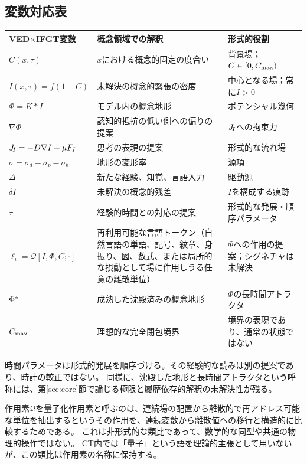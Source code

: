 \subsection{変数対応表}
\begin{center}
\renewcommand{\arraystretch}{1.5}
\begin{tabular}{p{}p{}p{}}
\toprule
\textbf{VED$\times$IFGT変数} &
\textbf{概念領域での解釈} &
\textbf{形式的役割} \\
\midrule
$C(x,\tau)$ & $x$における概念的固定の度合い & 背景場；$C \in [0,C_{\max})$ \\
$I(x,\tau) = f(1-C)$ & 未解決の概念的緊張の密度 & 中心となる場；常に$I > 0$ \\
$\Phi = K*I$ & モデル内の概念地形 & ポテンシャル幾何 \\
$\nabla\Phi$ & 認知的抵抗の低い側への偏りの提案 & $J_{\!I}$への拘束力 \\
$J_{\!I} = -D\nabla I + \mu F_I$ & 思考の表現の提案 & 形式的な流れ場 \\
$\sigma = \sigma_d - \sigma_p - \sigma_b$ & 地形の変形率 & 源項 \\
$\Delta$ & 新たな経験、知覚、言語入力 & 駆動源 \\
$\delta I$ & 未解決の概念的残差 & $I$を構成する痕跡 \\
$\tau$ & 経験的時間との対応の提案 & 形式的な発展・順序パラメータ \\
$\ell_i = \mathcal{Q}[I,\Phi,C;\cdot]$ & 再利用可能な言語トークン（自然言語の単語、記号、紋章、身振り、図、数式、または局所的な摂動として場に作用しうる任意の離散単位） & $\Phi$への作用の提案；シグネチャは未解決 \\
$\Phi^{*}$ & 成熟した沈殿済みの概念地形 & $\Phi$の長時間アトラクタ \\
$C_{\max}$ & 理想的な完全閉包境界 & 境界の表現であり、通常の状態ではない \\
\bottomrule
\end{tabular}
\end{center}

時間パラメータは形式的発展を順序づける。その経験的な読みは別の提案であり、時計の較正ではない。
同様に、沈殿した地形と長時間アトラクタという呼称には、第\ref{sec:core}節で論じる極限と履歴依存的解釈の未解決性が残る。

\begin{remark}[記法上の注意]
作用素$\mathcal{Q}$を量子化作用素と呼ぶのは、連続場の配置から離散的で再アドレス可能な単位を抽出するというその作用を、連続変数から離散値への移行と構造的に比較するためである。
これは非形式的な類比であって、数学的な同型や共通の物理的操作ではない。
CT内では「量子」という語を理論的主張として用いないが、この類比は作用素の名称に保持する。
\end{remark}

